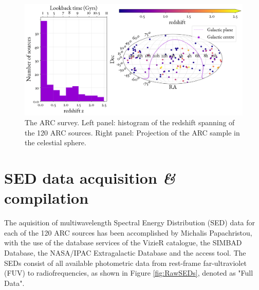 \begin{figure}
    \includegraphics[width=\textwidth]{figures/DataSet/ARCfield_redshiftleft_T.png}
    \caption{The ARC survey. Left panel: histogram of the redshift spanning of the 120 ARC sources. Right panel: Projection of the ARC sample in the celestial sphere.}
    \label{fig:ARC_field}
\end{figure}

\section{SED data acquisition \textit{\&} compilation}
The aquisition of multiwavelength Spectral Energy Distribution (SED) data for each of the 120 ARC sources has been accomplished by Michalis Papachristou, with the use of the database services of the VizieR catalogue, the SIMBAD Database, the NASA/IPAC Extragalactic Database and the \cite{astroquery} access tool. The SEDs consist of all available photometric data from rest-frame far-ultraviolet (FUV) to radiofrequencies, as shown in Figure \ref{fig:RawSEDs}, denoted as "Full Data". 

